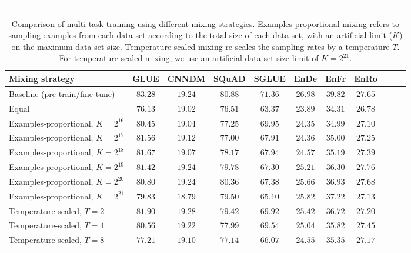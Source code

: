 \documentclass[twoside,11pt]{article}
\newlength{\offsetpage}
\newenvironment{widepage}{\begin{adjustwidth}{-\offsetpage}{-\offsetpage}
    \addtolength{\textwidth}{2\offsetpage}}
{\end{adjustwidth}}
\newcommand{\bsl}{\makebox[0pt][r]{\raisebox{0.05em}{$\bigstar\,$}}}
\def\*#1{\mathbf{#1}}
\begin{document}
\begin{table}
\footnotesize
\begin{widepage}
\centering
\begin{tabular}{l c c c c c c c c c c}
\toprule
    Mixing strategy                     & GLUE        & CNNDM       & SQuAD       & SGLUE       & EnDe        & EnFr        & EnRo    \\
\midrule
    \bsl Baseline (pre-train/fine-tune) & $\*{83.28}$ & $\*{19.24}$ & $\*{80.88}$ & $\*{71.36}$ & $\*{26.98}$ & $\*{39.82}$ & $\*{27.65}$ \\
    Equal                               & $76.13$     & $19.02$     & $76.51$     & $63.37$     & $23.89$     & $34.31$     & $26.78$ \\
    Examples-proportional, $K = 2^{16}$ & $80.45$     & $19.04$     & $77.25$     & $69.95$     & $24.35$     & $34.99$     & $27.10$ \\
    Examples-proportional, $K = 2^{17}$ & $81.56$     & $19.12$     & $77.00$     & $67.91$     & $24.36$     & $35.00$     & $27.25$ \\
    Examples-proportional, $K = 2^{18}$ & $81.67$     & $19.07$     & $78.17$     & $67.94$     & $24.57$     & $35.19$     & $27.39$ \\
    Examples-proportional, $K = 2^{19}$ & $81.42$     & $\*{19.24}$ & $79.78$     & $67.30$     & $25.21$     & $36.30$     & $\*{27.76}$ \\
    Examples-proportional, $K = 2^{20}$ & $80.80$     & $\*{19.24}$ & $\*{80.36}$ & $67.38$     & $25.66$     & $36.93$     & $\*{27.68}$ \\
    Examples-proportional, $K = 2^{21}$ & $79.83$     & $18.79$     & $79.50$     & $65.10$     & $25.82$     & $37.22$     & $27.13$ \\
    Temperature-scaled, $T = 2$         & $81.90$     & $\*{19.28}$ & $79.42$     & $69.92$     & $25.42$     & $36.72$     & $27.20$ \\
    Temperature-scaled, $T = 4$         & $80.56$     & $\*{19.22}$ & $77.99$     & $69.54$     & $25.04$     & $35.82$     & $27.45$ \\
    Temperature-scaled, $T = 8$         & $77.21$     & $19.10$     & $77.14$     & $66.07$     & $24.55$     & $35.35$     & $27.17$ \\
\bottomrule
\end{tabular}
\end{widepage}
\caption{
Comparison of multi-task training using different mixing strategies.
Examples-proportional mixing refers to sampling examples from each data set according to the total size of each data set, with an artificial limit ($K$) on the maximum data set size.
Temperature-scaled mixing re-scales the sampling rates by a temperature $T$.
For temperature-scaled mixing, we use an artificial data set size limit of $K = 2^{21}$.
}
\label{tab:multitask}
\end{table}
\end{document}
